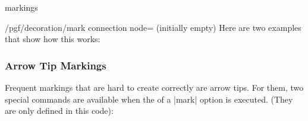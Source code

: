 \begin{decoration}{markings}
\begin{key}{/pgf/decoration/mark connection node= (initially empty)}
    Here are two examples that show how this works:
\begin{codeexample}[]
\end{codeexample}

\begin{codeexample}[]
\end{codeexample}

  \end{key}
\end{decoration}


\subsubsection{Arrow Tip Markings}

Frequent markings that are hard to create correctly are arrow
tips. For them, two special commands are available when the  of
a |mark| option is executed. (They are only defined in this code):


